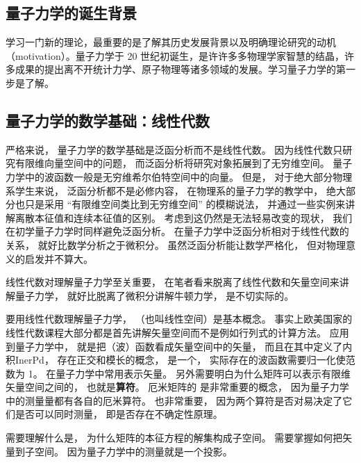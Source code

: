
\begin{issues}
\issueTODO
\end{issues}
\subsection{量子力学的诞生背景}
学习一门新的理论，最重要的是了解其历史发展背景以及明确理论研究的动机（motivation）。量子力学于 20 世纪初诞生，是许许多多物理学家智慧的结晶，许多成果的提出离不开统计力学、原子物理等诸多领域的发展。学习量子力学的第一步是了解。

\subsection{量子力学的数学基础：线性代数}
严格来说， 量子力学的数学基础是泛函分析而不是线性代数。 因为线性代数只研究有限维向量空间中的问题， 而泛函分析将研究对象拓展到了无穷维空间。 量子力学中的波函数一般是无穷维希尔伯特空间中的向量。 但是， 对于绝大部分物理系学生来说， 泛函分析都不是必修内容， 在物理系的量子力学的教学中， 绝大部分也只是采用 “有限维空间类比到无穷维空间” 的模糊说法， 并通过一些实例来讲解离散本征值和连续本征值的区别。 考虑到这仍然是无法轻易改变的现状， 我们在初学量子力学时同样避免泛函分析。 在量子力学中泛函分析相对于线性代数的关系， 就好比数学分析之于微积分。 虽然泛函分析能让数学严格化， 但对物理意义的启发并不算大。

线性代数对理解量子力学至关重要， 在笔者看来脱离了线性代数和矢量空间来讲解量子力学， 就好比脱离了微积分讲解牛顿力学， 是不切实际的。 

要用线性代数理解量子力学， （也叫线性空间）是基本概念。 事实上欧美国家的线性代数课程大部分都是首先讲解矢量空间而不是例如行列式的计算方法。 应用到量子力学中， 就是把（波）函数看成矢量空间中的矢量， 而且在其中定义了{内积}{InerPd}， 存在正交和模长的概念， 是一个， 实际存在的波函数需要归一化使范数为 1。 在量子力学中常用表示矢量。 另外需要明白为什么矩阵可以表示有限维矢量空间之间的， 也就是\textbf{算符}。 厄米矩阵的 是非常重要的概念， 因为量子力学中的测量量都有各自的厄米算符。  也非常重要， 因为两个算符是否对易决定了它们是否可以同时测量， 即是否存在不确定性原理。

需要理解什么是， 为什么矩阵的本征方程的解集构成子空间。 需要掌握如何把矢量到子空间。 因为量子力学中的测量就是一个投影。

